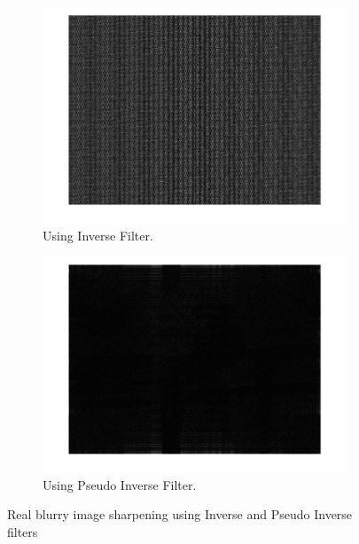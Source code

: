 \graphicspath{{mehul_pics/}}%

\begin{figure}[H]
        \centering
        \begin{subfigure}[b]{0.49\textwidth}
                \centering
                \includegraphics[width=\textwidth]{inverse.jpg}
                \caption{Using Inverse Filter.}
        \end{subfigure}
        \begin{subfigure}[b]{0.49\textwidth}
                 \centering
                 \includegraphics[width=\textwidth]{pseudo_inverse.jpg}
                 \caption{Using Pseudo Inverse Filter.}
                 \label{fig:friends}
                       
        \end{subfigure}             
        \caption{Real blurry image sharpening using Inverse and Pseudo Inverse filters} 
\end{figure}

